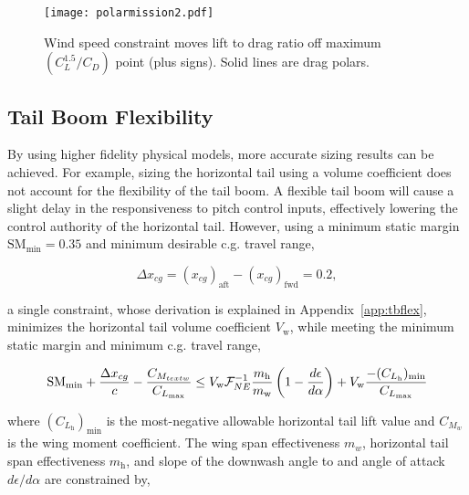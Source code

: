 \begin{figure}[h!]
	\begin{center}
	\texttt{[image: polarmission2.pdf]}
    \caption{Wind speed constraint moves lift to drag ratio off maximum $(C_L^{1.5}/C_D)$ point (plus signs). Solid lines are drag polars.}
 \label{f:polarmission}
	\end{center}
\end{figure}

\subsection{Tail Boom Flexibility}

By using higher fidelity physical models, more accurate sizing results can be achieved.  
For example, sizing the horizontal tail using a volume coefficient does not account for the flexibility of the tail boom. 
A flexible tail boom will cause a slight delay in the responsiveness to pitch control inputs, effectively lowering the control authority of the horizontal tail. 
However, using a minimum static margin $\text{SM}_{\text{min}} = 0.35$ and minimum desirable c.g. travel range,

\begin{equation}
    \label{e:deltacg}
    \Delta x_{cg} = (x_{cg})_{\text{aft}} - (x_{cg})_{\text{fwd}} = 0.2,
\end{equation}

a single constraint, whose derivation is explained in Appendix~\ref{app:tbflex}, minimizes the horizontal tail volume coefficient $V_{\text{w}}$, while meeting the minimum static margin and minimum c.g. travel range,

\begin{equation}
    \label{e:smcorr}
    \text{SM}_{\text{min}} + \frac{\Delta x_{cg}}{c} - \frac{C_{M_{text{w}}}}{C_{L_{\text{max}}}} \leq V_{\text{w}} \mathcal{F}_{NE}^{-1} \frac{m_{\text{h}}}{m_{\text{w}}} \left( 1 - \frac{d\epsilon}{d\alpha}\right) + V_{\text{w}} \frac{-(C_{L_{\text{h}}})_{\text{min}}}{C_{L_{\text{max}}}} \\
\end{equation}

where $(C_{L_{\text{h}}})_{\text{min}}$ is the most-negative allowable horizontal tail lift value and $C_{M_w}$ is the wing moment coefficient.
The wing span effectiveness $m_w$, horizontal tail span effectiveness $m_{\text{h}}$, and slope of the downwash angle to and angle of attack $d\epsilon/d\alpha$ are constrained by,

